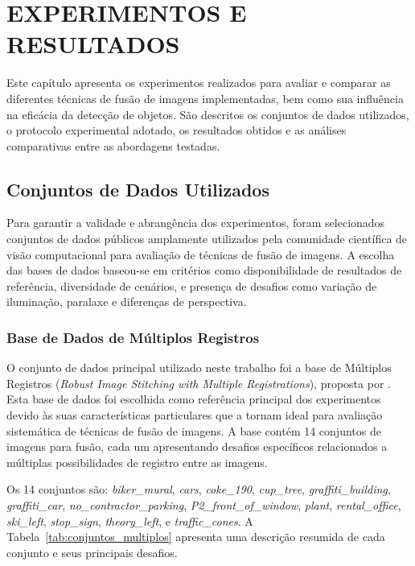 
\chapter{EXPERIMENTOS E RESULTADOS}

Este capítulo apresenta os experimentos realizados para avaliar e comparar as diferentes técnicas de fusão de imagens implementadas, bem como sua influência na eficácia da detecção de objetos. São descritos os conjuntos de dados utilizados, o protocolo experimental adotado, os resultados obtidos e as análises comparativas entre as abordagens testadas.

\section{Conjuntos de Dados Utilizados}

Para garantir a validade e abrangência dos experimentos, foram selecionados conjuntos de dados públicos amplamente utilizados pela comunidade científica de visão computacional para avaliação de técnicas de fusão de imagens. A escolha das bases de dados baseou-se em critérios como disponibilidade de resultados de referência, diversidade de cenários, e presença de desafios como variação de iluminação, paralaxe e diferenças de perspectiva.

\subsection{Base de Dados de Múltiplos Registros}

O conjunto de dados principal utilizado neste trabalho foi a base de Múltiplos Registros (\textit{Robust Image Stitching with Multiple Registrations}), proposta por \cite{zhang2018robust}. Esta base de dados foi escolhida como referência principal dos experimentos devido às suas características particulares que a tornam ideal para avaliação sistemática de técnicas de fusão de imagens. A base contém 14 conjuntos de imagens para fusão, cada um apresentando desafios específicos relacionados a múltiplas possibilidades de registro entre as imagens.

Os 14 conjuntos são: \textit{biker\_mural}, \textit{cars}, \textit{coke\_190}, \textit{cup\_tree}, \textit{graffiti\_building}, \textit{graffiti\_car}, \textit{no\_contractor\_parking}, \textit{P2\_front\_of\_window}, \textit{plant}, \textit{rental\_office}, \textit{ski\_left}, \textit{stop\_sign}, \textit{theory\_left}, e \textit{traffic\_cones}. A Tabela~\ref{tab:conjuntos_multiplos} apresenta uma descrição resumida de cada conjunto e seus principais desafios.

